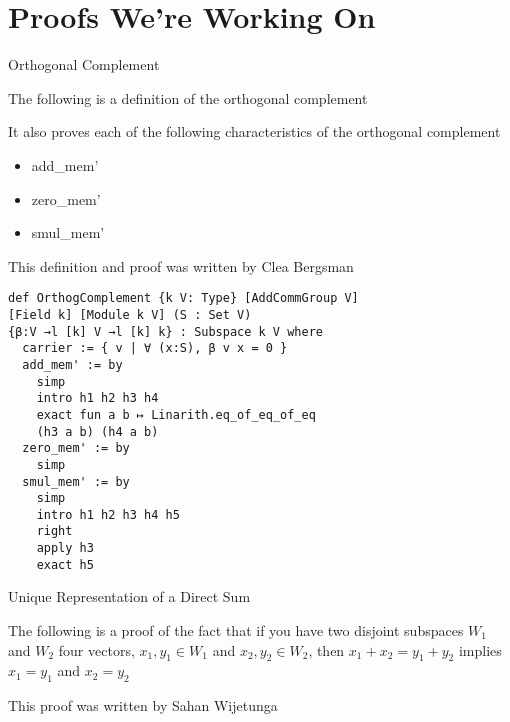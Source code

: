 \documentclass{beamer}
\begin{document}


\section{Proofs We're Working On}



\begin{frame}  {Orthogonal Complement}
\item The following is a definition of the orthogonal complement 
\item It also proves each of the following characteristics of the orthogonal complement
\begin{itemize}
    \item add\_mem'
    \item zero\_mem'
    \item smul\_mem'
\end{itemize}
\item This definition and proof was written by Clea Bergsman

\end{frame}

\begin{verbatim}
def OrthogComplement {k V: Type} [AddCommGroup V] 
[Field k] [Module k V] (S : Set V) 
{β:V →l [k] V →l [k] k} : Subspace k V where
  carrier := { v | ∀ (x:S), β v x = 0 }
  add_mem' := by 
    simp
    intro h1 h2 h3 h4
    exact fun a b ↦ Linarith.eq_of_eq_of_eq 
    (h3 a b) (h4 a b)
  zero_mem' := by
    simp 
  smul_mem' := by 
    simp
    intro h1 h2 h3 h4 h5
    right
    apply h3
    exact h5
\end{verbatim}


\begin{frame} {Unique Representation of a Direct Sum}
\item The following is a proof of the fact that if you have two disjoint subspaces $W_1$ and $W_2$ four vectors, $x_1, y_1 \in W_1 $ and $x_2, y_2 \in W_2$, then $x_1 + x_2 = y_1 + y_2 $ implies $x_1 = y_1$ and $x_2 = y_2$

\item This proof was written by Sahan Wijetunga
\end{frame}
\end{document}
